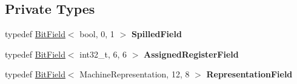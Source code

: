 \subsection*{Private Types}
\begin{DoxyCompactItemize}
\item 
typedef \hyperlink{classv8_1_1internal_1_1_bit_field}{Bit\+Field}$<$ bool, 0, 1 $>$ {\bfseries Spilled\+Field}\hypertarget{classv8_1_1internal_1_1compiler_1_1_live_range_a031956b67bbf925d59c2ca97e4069f39}{}\label{classv8_1_1internal_1_1compiler_1_1_live_range_a031956b67bbf925d59c2ca97e4069f39}

\item 
typedef \hyperlink{classv8_1_1internal_1_1_bit_field}{Bit\+Field}$<$ int32\+\_\+t, 6, 6 $>$ {\bfseries Assigned\+Register\+Field}\hypertarget{classv8_1_1internal_1_1compiler_1_1_live_range_acdfa6016b87f4132596b316598a6c15a}{}\label{classv8_1_1internal_1_1compiler_1_1_live_range_acdfa6016b87f4132596b316598a6c15a}

\item 
typedef \hyperlink{classv8_1_1internal_1_1_bit_field}{Bit\+Field}$<$ Machine\+Representation, 12, 8 $>$ {\bfseries Representation\+Field}\hypertarget{classv8_1_1internal_1_1compiler_1_1_live_range_a50c61bfefaf06fe30acd2232c50395f3}{}\label{classv8_1_1internal_1_1compiler_1_1_live_range_a50c61bfefaf06fe30acd2232c50395f3}

\end{DoxyCompactItemize}
